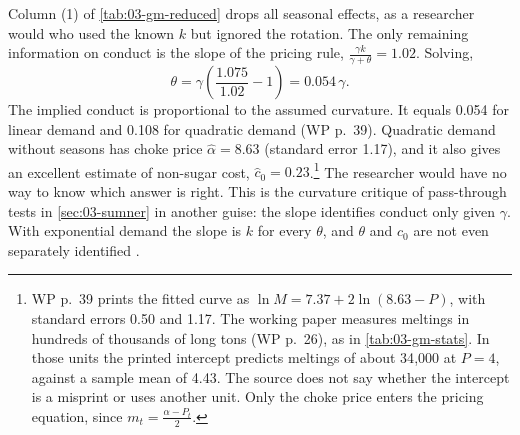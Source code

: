 Column (1) of \cref{tab:03-gm-reduced} drops all seasonal effects, as a researcher would who used the known
$k$ but ignored the rotation. The only remaining information on conduct is the slope of the pricing rule,
$\frac{\gamma k}{\gamma + \theta} = 1.02$. Solving,
\begin{equation*}
\theta = \gamma\left(\frac{1.075}{1.02} - 1\right) = 0.054\,\gamma .
\end{equation*}
The implied conduct is proportional to the assumed curvature. It equals 0.054 for linear demand and 0.108 for
quadratic demand (WP p.~39). Quadratic demand without seasons has choke price $\hat\alpha = 8.63$ (standard
error 1.17), and it also gives an excellent estimate of non-sugar cost, $\hat c_0 = 0.23$.\footnote{WP p.~39
prints the fitted curve as $\ln M = 7.37 + 2\ln(8.63 - P)$, with standard errors 0.50 and 1.17. The working
paper measures meltings in hundreds of thousands of long tons (WP p.~26), as in \cref{tab:03-gm-stats}. In
those units the printed intercept predicts meltings of about 34{,}000 at $P = 4$, against a sample mean of
4.43. The source does not say whether the intercept is a misprint or uses another unit. Only the choke price
enters the pricing equation, since $m_t = \frac{\alpha - P_t}{2}$.} The researcher
would have no way to know which answer is right. This is the curvature critique of pass-through tests in
\cref{sec:03-sumner} in another guise: the slope identifies conduct only given $\gamma$. With exponential
demand the slope is $k$ for every $\theta$, and $\theta$ and $c_0$ are not even separately identified
\citep{BulowPfleiderer1983}.

